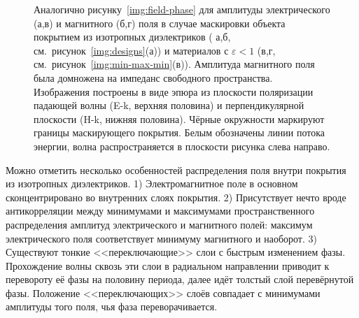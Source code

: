 \begin{figure}[p]
  \begin{minipage}[ht]{0.495\linewidth}
  \end{minipage}
  \hfill
  \begin{minipage}[ht]{0.495\linewidth}
  \end{minipage}
  \begin{minipage}[ht]{0.495\linewidth}
  \end{minipage}
  \hfill
  \begin{minipage}[ht]{0.495\linewidth}
  \end{minipage}

  \caption{Аналогично рисунку~\ref{img:field-phase} для амплитуды
    электрического (а,в) и магнитного (б,г) поля в случае маскировки
    объекта покрытием из изотропных диэлектриков ( а,б,
    см.~рисунок~\ref{img:designs}(а)) и материалов с
    ${\varepsilon <1}$ (в,г,
    см.~рисунок~\ref{img:min-max-min}(в)). Амплитуда магнитного поля
    была домножена на импеданс свободного пространства. Изображения
    построены в виде эпюра из плоскости поляризации падающей волны
    (E-k, верхняя половина) и перпендикулярной плоскости (H-k, нижняя
    половина). Чёрные окружности маркируют границы маскирующего
    покрытия. Белым обозначены линии потока энергии, волна
    распространяется в плоскости рисунка слева направо.}
  \label{img:field-amplitude}
\end{figure}

Можно отметить несколько особенностей распределения поля внутри
покрытия из изотропных диэлектриков. 1) Электромагнитное поле в
основном сконцентрировано во внутренних слоях покрытия. 2)
Присутствует нечто вроде антикорреляции между минимумами и максимумами
пространственного распределения амплитуд электрического и магнитного
полей: максимум электрического поля соответствует минимуму магнитного
и наоборот. 3) Существуют тонкие <<переключающие>> слои с быстрым
изменением фазы.  Прохождение волны сквозь эти слои в радиальном
направлении приводит к перевороту её фазы на половину периода, далее
идёт толстый слой перевёрнутой фазы.  Положение <<переключающих>>
слоёв совпадает с минимумами амплитуды того поля, чья фаза
переворачивается.

